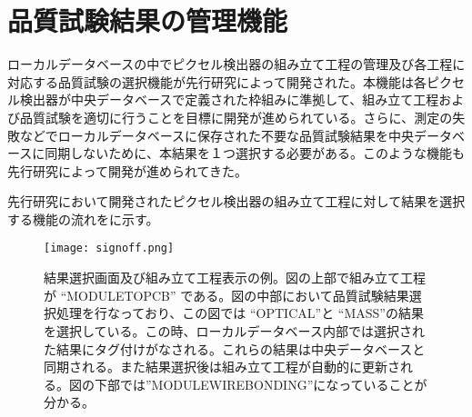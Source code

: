 \section{品質試験結果の管理機能}
\label{sec:kanri}

ローカルデータベースの中でピクセル検出器の組み立て工程の管理及び各工程に対応する品質試験の選択機能が先行研究\cite{oku}によって開発された。本機能は各ピクセル検出器が中央データベースで定義された枠組みに準拠して、組み立て工程および品質試験を適切に行うことを目標に開発が進められている。さらに、測定の失敗などでローカルデータベースに保存された不要な品質試験結果を中央データベースに同期しないために、本結果を１つ選択する必要がある。このような機能も先行研究によって開発が進められてきた。

先行研究において開発されたピクセル検出器の組み立て工程に対して結果を選択する機能の流れをに示す。
\begin{figure}[tbp]
  \centering
  \texttt{[image: signoff.png]}
  \caption[結果選択画面及び組み立て工程表示の例]{結果選択画面及び組み立て工程表示の例\cite{oku}。図の上部で組み立て工程が “MODULETOPCB” である。図の中部において品質試験結果選択処理を行なっており、この図では “OPTICAL”と “MASS”の結果を選択している。この時、ローカルデータベース内部では選択された結果にタグ付けがなされる。これらの結果は中央データベースと同期される。また結果選択後は組み立て工程が自動的に更新される。図の下部では”MODULEWIREBONDING”になっていることが分かる。}
  \label{fig:sign-off}
\end{figure}

